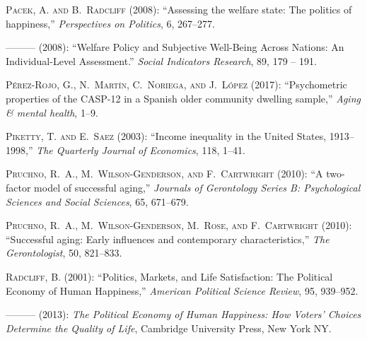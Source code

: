 \documentclass[10pt, letterpaper]{article}
\begin{document}
\begin{spacing}{1.4}
\begin{thebibliography}{87}
\textsc{Pacek, A. and B.~Radcliff} (2008{}): \enquote{Assessing the
  welfare state: The politics of happiness,} \emph{Perspectives on Politics},
  6, 267--277.

---\hspace{-.1pt}---\hspace{-.1pt}--- (2008{}): \enquote{Welfare
  Policy and Subjective Well-Being Across Nations: An Individual-Level
  Assessment.} \emph{Social Indicators Research}, 89, 179 -- 191.

\textsc{P{\'e}rez-Rojo, G., N.~Mart{\'\i}n, C.~Noriega, and J.~L{\'o}pez}
  (2017): \enquote{Psychometric properties of the CASP-12 in a Spanish older
  community dwelling sample,} \emph{Aging \& mental health}, 1--9.

\textsc{Piketty, T. and E.~Saez} (2003): \enquote{Income inequality in the
  United States, 1913--1998,} \emph{The Quarterly Journal of Economics}, 118,
  1--41.

\textsc{Pruchno, R.~A., M.~Wilson-Genderson, and F.~Cartwright}
  (2010{}): \enquote{A two-factor model of successful aging,}
  \emph{Journals of Gerontology Series B: Psychological Sciences and Social
  Sciences}, 65, 671--679.

\textsc{Pruchno, R.~A., M.~Wilson-Genderson, M.~Rose, and F.~Cartwright}
  (2010{}): \enquote{Successful aging: Early influences and
  contemporary characteristics,} \emph{The Gerontologist}, 50, 821--833.

\textsc{Radcliff, B.} (2001): \enquote{Politics, Markets, and Life
  Satisfaction: The Political Economy of Human Happiness,} \emph{American
  Political Science Review}, 95, 939--952.

---\hspace{-.1pt}---\hspace{-.1pt}--- (2013): \emph{The Political Economy of
  Human Happiness: How Voters' Choices Determine the Quality of Life},
  Cambridge University Press, New York NY.


\end{thebibliography}
\end{spacing}
\end{document}
